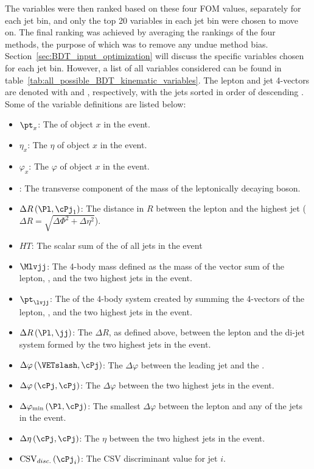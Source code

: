 The variables were then ranked based on these four FOM values, separately for each jet bin, and only the top 20 variables in each jet bin were chosen to move on.
The final ranking was achieved by averaging the rankings of the four methods, the purpose of which was to remove any undue method bias.
Section~\ref{sec:BDT_input_optimization} will discuss the specific variables chosen for each jet bin.
However, a list of all variables considered can be found in table~\ref{tab:all_possible_BDT_kinematic_variables}.
The lepton and jet 4-vectors are denoted with \Pl and \cPj, respectively, with the jets sorted in order of descending \pt.
Some of the variable definitions are listed below:
\begin{itemize}
  \item ${{}\pt}_{x}$: The \pt of object $x$ in the event.
  \item ${{}\eta}_{x}$: The $\eta$ of object $x$ in the event.
  \item ${{}\varphi}_{x}$: The $\varphi$ of object $x$ in the event.
  \item \Mt: The transverse component of the mass of the leptonically decaying \W boson.
  \item $\Delta{R}\left(\Pl,\cPj_{\text{1}}\right)$: The distance in $R$ between the lepton and the highest \pt jet ($\Delta{R}=\sqrt{\Delta\Phi^{2}+\Delta\eta^{2}}$).
  \item $HT$: The scalar sum of the \pt of all jets in the event
  \item $\Mlvjj$: The 4-body mass defined as the mass of the vector sum of the lepton, \VETslash, and the two highest \pt jets in the event.
  \item ${{}\pt}_{\lvjj}$: The \pt of the 4-body system created by summing the 4-vectors of the lepton, \VETslash, and the two highest \pt jets in the event.
  \item $\Delta{R}\left(\Pl,\jj\right)$: The $\Delta{R}$, as defined above, between the lepton and the di-jet system formed by the two highest \pt jets in the event. 
  \item $\Delta\varphi\left(\VETslash,\cPj\right)$: The $\Delta\varphi$ between the leading jet and the \VETslash.
  \item $\Delta\varphi\left(\cPj,\cPj\right)$: The $\Delta\varphi$ between the two highest \pt jets in the event.
  \item $\Delta\varphi_{\text{min}}\left(\Pl,\cPj\right)$: The smallest $\Delta\varphi$ between the lepton and any of the jets in the event.
  \item $\Delta\eta\left(\cPj,\cPj\right)$: The $\eta$ between the two highest \pt jets in the event.
  \item $\text{CSV}_{disc.}\left(\cPj_{i}\right)$: The CSV discriminant value for jet $i$.
\end{itemize}

